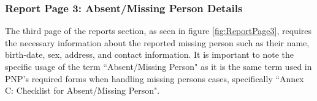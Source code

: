 \subsubsection{Report Page 3: Absent/Missing Person Details}

The third page of the reports section, as seen in figure \ref{fig:ReportPage3}, requires the necessary information about the reported missing person such as their name, birth-date, sex, address, and contact information. It is important to note the specific usage of the term ``Absent/Missing Person" as it is the same term used in PNP's required forms when handling missing persons cases, specifically ``Annex C: Checklist for Absent/Missing Person".

\begin{figure}[!h]
    \centering
    \begin{subfigure}[c]{0.30\linewidth}
        \centering

\end{subfigure}
\end{figure}
